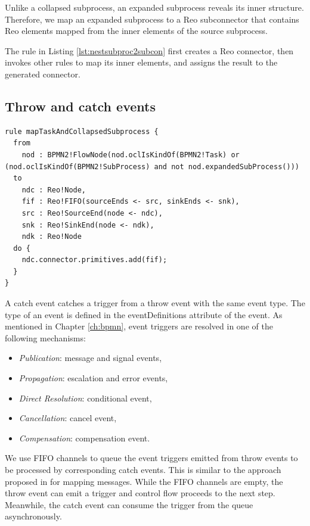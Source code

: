 Unlike a collapsed {subprocess}, an expanded {subprocess} reveals its inner structure. Therefore, we map an expanded subprocess to a Reo {subconnector} that contains Reo elements mapped from the inner elements of the source {subprocess}.  

The rule in Listing \ref{lst:nestsubproc2subcon} first creates a Reo {connector}, then invokes other rules to map its inner elements, and assigns the result to the generated {connector}. 

\subsection{Throw and catch events}
\begin{lstlisting}[float,frame=single, caption=Mapping tasks and collapsed subprocesses,label=lst:colsubproc]
rule mapTaskAndCollapsedSubprocess {
  from
    nod : BPMN2!FlowNode(nod.oclIsKindOf(BPMN2!Task) or (nod.oclIsKindOf(BPMN2!SubProcess) and not nod.expandedSubProcess()))
  to
    ndc : Reo!Node,
    fif : Reo!FIFO(sourceEnds <- src, sinkEnds <- snk),
    src : Reo!SourceEnd(node <- ndc),
    snk : Reo!SinkEnd(node <- ndk),
    ndk : Reo!Node 
  do {  
    ndc.connector.primitives.add(fif);
  }
}
\end{lstlisting}

A {catch} event catches a trigger from a {throw} event with the same event type. The type of an event is defined in the {eventDefinitions} attribute of the event. 
As mentioned in Chapter \ref{ch:bpmn}, event triggers are resolved in one of the following mechanisms:  

\begin{itemize}
\item \emph{Publication}: {message} and {signal} events, 
\item \emph{Propagation}: {escalation} and {error} events,
\item \emph{Direct Resolution}: {conditional} event,
\item \emph{Cancellation}: {cancel} event,
\item \emph{Compensation}: {compensation} event.
\end{itemize}

We use {FIFO} channels to queue the event triggers emitted from {throw} events to be processed by corresponding {catch} events. This is  similar to the approach proposed in \cite{bpmn2reo} for mapping messages. While the {FIFO} channels are empty, the {throw} event can emit a trigger and control flow proceeds to the next step. Meanwhile, the {catch} event can consume the trigger from the queue asynchronously.

